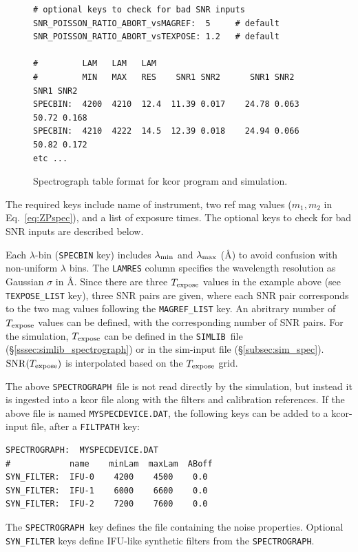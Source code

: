 \documentclass[12pt]{article}
\newcommand{\SPEC}{{\tt SPECTROGRAPH}}
\newcommand{\Texpose}{T_{\rm expose}}
\newcommand{\simlib}{{\tt SIMLIB}}
\newcommand{\lam}{\lambda}
\begin{document}
{\begin{figure} [ht]
\begin{center}
\begin{Verbatim}[frame=single]
# optional keys to check for bad SNR inputs
SNR_POISSON_RATIO_ABORT_vsMAGREF:  5     # default
SNR_POISSON_RATIO_ABORT_vsTEXPOSE: 1.2   # default

#         LAM   LAM   LAM
#         MIN   MAX   RES    SNR1 SNR2      SNR1 SNR2      SNR1 SNR2
SPECBIN:  4200  4210  12.4  11.39 0.017    24.78 0.063    50.72 0.168   
SPECBIN:  4210  4222  14.5  12.39 0.018    24.94 0.066    50.82 0.172   
etc ...
\end{Verbatim}
\end{center}
\caption{
  Spectrograph table format for kcor program and simulation.
 }
\label{fig:spectro_table}
\end{figure}
%
The required keys include name of instrument,
two ref mag values ($m_1,m_2$ in Eq.~\ref{eq:ZPspec}),
and a list of exposure times. The optional keys to 
check for bad SNR inputs are described below.

Each $\lam$-bin ({\tt SPECBIN} key) includes 
$\lam_{\rm min}$ and $\lam_{\rm max}$ (\AA)
to avoid confusion with non-uniform $\lam$ bins. 
The {\tt LAMRES} column specifies the wavelength resolution
as Gaussian $\sigma$ in \AA.
Since there are three $\Texpose$ values in the example above
(see {\tt TEXPOSE\_LIST} key),
three SNR pairs are given, where each SNR pair corresponds
to the two mag values following the {\tt MAGREF\_LIST} key.
An abritrary number of $\Texpose$ values can be defined,
with the corresponding number of SNR pairs.
For the simulation, $\Texpose$ can be defined in the
\simlib\ file (\S\ref{sssec:simlib_spectrograph})
or in the sim-input file (\S\ref{subsec:sim_spec}).
${\rm SNR}(\Texpose)$ is interpolated based on the $\Texpose$ grid.

The above \SPEC\ file is not read directly by the simulation,
but instead it is ingested into a kcor file along with the
filters and calibration references.
If the above file is named {\tt MYSPECDEVICE.DAT},
the following keys can be added to a kcor-input file,
after a {\tt FILTPATH} key:

\clearpage
%
\begin{Verbatim}[frame=single]
SPECTROGRAPH:  MYSPECDEVICE.DAT
#            name    minLam  maxLam  ABoff
SYN_FILTER:  IFU-0    4200    4500    0.0
SYN_FILTER:  IFU-1    6000    6600    0.0
SYN_FILTER:  IFU-2    7200    7600    0.0 
\end{Verbatim}
The \SPEC\ key defines the file containing the noise properties.
Optional {\tt SYN\_FILTER} keys define IFU-like synthetic
filters from the \SPEC. 

}
\end{document}
